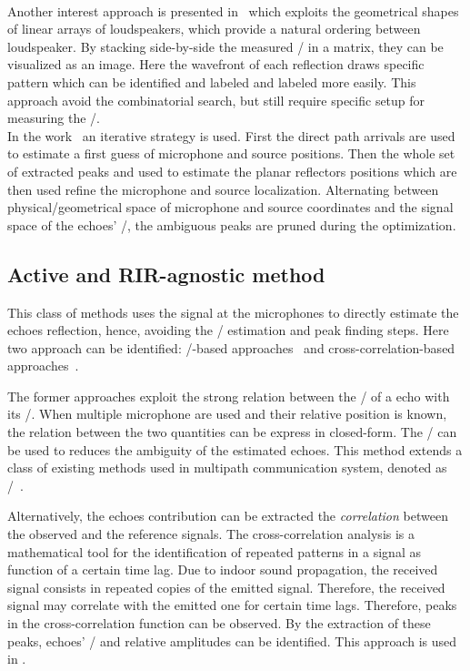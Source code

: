 \\Another interest approach is presented in~ which exploits the geometrical shapes of linear arrays of loudspeakers, which provide a natural ordering between loudspeaker.
By stacking side-by-side the measured \RIRs/ in a matrix, they can be visualized as an image.
Here the wavefront of each reflection draws specific pattern which can be identified and labeled and labeled more easily.
This approach avoid the combinatorial search, but still require specific setup for measuring the \RIRs/.
\\In the work~ an iterative strategy is used.
First the direct path arrivals are used to estimate a first guess of microphone and source positions.
Then the whole set of extracted peaks and used to estimate the planar reflectors positions which are then used refine the microphone and source localization.
Alternating between physical/geometrical space of microphone and source coordinates and the signal space of the echoes' \TOAs/, the ambiguous peaks are pruned during the optimization.

\subsection{Active and RIR-agnostic method}
This class of methods uses the signal at the microphones to directly estimate the echoes reflection, hence, avoiding the \RIR/ estimation and peak finding steps.
Here two approach can be identified: \ML/-based approaches~ and cross-correlation-based approaches~.

The former approaches exploit the strong relation between the \TOA/ of a echo with its \DOA/.
When multiple microphone are used and their relative position is known, the relation between the two quantities can be express in closed-form.
The \DOAs/ can be used to reduces the ambiguity of the estimated echoes.
This method extends a class of existing methods used in multipath communication system, denoted as \JADE/~.

Alternatively, the echoes contribution can be extracted the \textit{correlation} between the observed and the reference signals.
The cross-correlation analysis is a mathematical tool for the identification of repeated patterns in a signal as function of a certain time lag.
Due to indoor sound propagation, the received signal consists in repeated copies of the emitted signal.
Therefore, the received signal may correlate with the emitted one for certain time lags.
Therefore, peaks in the cross-correlation function can be observed.
By the extraction of these peaks, echoes' \TOAs/ and relative amplitudes can be identified.
This approach is used in .

